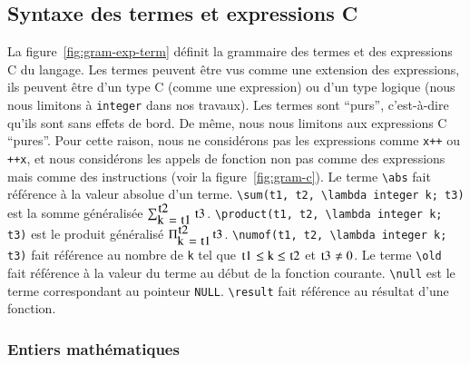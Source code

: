 \subsection{Syntaxe des termes \eacsl et expressions C}



La figure~\ref{fig:gram-exp-term} définit la grammaire des termes \eacsl et des
expressions C du langage.
Les termes peuvent être vus comme une extension des expressions, ils peuvent
être d'un type C (comme une expression) ou d'un type logique (nous nous
limitons à \lstinline'integer' dans nos travaux).
Les termes sont ``purs'', c'est-à-dire qu'ils sont sans effets de bord.
De même, nous nous limitons aux expressions C ``pures''.
Pour cette raison, nous ne considérons pas les expressions comme \lstinline'x++'
ou \lstinline'++x', et nous considérons les appels de fonction non pas comme des
expressions mais comme des instructions (voir la figure~\ref{fig:gram-c}).
Le terme \lstinline'\abs' fait référence à la valeur absolue d'un terme.
\lstinline'\sum(t1, t2, \lambda integer k; t3)' est la somme généralisée
$\sum_{\mbox{\lstinline'k = t1'}}^{\mbox{\lstinline't2'}}\mbox{\lstinline't3'}$.
\lstinline'\product(t1, t2, \lambda integer k; t3)' est le produit
généralisé $\Pi_{\mbox{\lstinline'k = t1'}}^{\mbox{\lstinline't2'}}\mbox{\lstinline't3'}$.
\lstinline'\numof(t1, t2, \lambda integer k; t3)' fait référence au nombre de
\lstinline'k' tel que
$\mbox{\lstinline't1'} \le \mbox{\lstinline'k'} \le \mbox{\lstinline't2'}$ et
$\mbox{\lstinline't3'} \neq 0$.
Le terme \lstinline'\old' fait référence à la valeur du terme au début de la
fonction courante.
\lstinline'\null' est le terme correspondant au pointeur \lstinline'NULL'.
\lstinline{\result} fait référence au résultat d'une fonction.


\subsubsection{Entiers mathématiques}
\label{sec:eacsl-integers}



